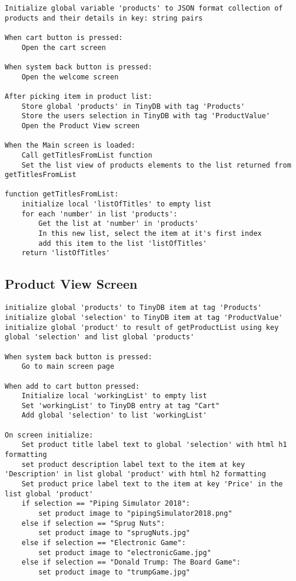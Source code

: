 \documentclass{scrreprt}
\begin{document}
\begin{lstlisting}
Initialize global variable 'products' to JSON format collection of products and their details in key: string pairs

When cart button is pressed:
    Open the cart screen
    
When system back button is pressed:
    Open the welcome screen
    
After picking item in product list:
    Store global 'products' in TinyDB with tag 'Products'
    Store the users selection in TinyDB with tag 'ProductValue'
    Open the Product View screen

When the Main screen is loaded:
    Call getTitlesFromList function
    Set the list view of products elements to the list returned from getTitlesFromList

function getTitlesFromList:
    initialize local 'listOfTitles' to empty list
    for each 'number' in list 'products':
        Get the list at 'number' in 'products'
        In this new list, select the item at it's first index
        add this item to the list 'listOfTitles'
    return 'listOfTitles'
\end{lstlisting}

\subsection*{Product View Screen}

\begin{lstlisting}
initialize global 'products' to TinyDB item at tag 'Products'
initialize global 'selection' to TinyDB item at tag 'ProductValue'
initialize global 'product' to result of getProductList using key global 'selection' and list global 'products'

When system back button is pressed:
    Go to main screen page
    
When add to cart button pressed:
    Initialize local 'workingList' to empty list
    Set 'workingList' to TinyDB entry at tag "Cart"
    Add global 'selection' to list 'workingList'    

On screen initialize:
    Set product title label text to global 'selection' with html h1 formatting
    set product description label text to the item at key 'Description' in list global 'product' with html h2 formatting
    Set product price label text to the item at key 'Price' in the list global 'product'
    if selection == "Piping Simulator 2018":
        set product image to "pipingSimulator2018.png"
    else if selection == "Sprug Nuts":
        set product image to "sprugNuts.jpg"
    else if selection == "Electronic Game":
        set product image to "electronicGame.jpg"
    else if selection == "Donald Trump: The Board Game":
        set product image to "trumpGame.jpg"
\end{lstlisting}
\end{document}
